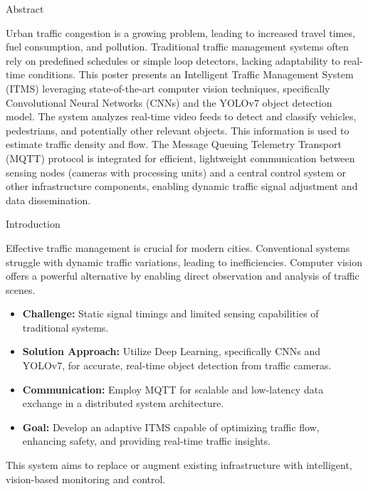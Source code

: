 \documentclass[final]{beamer}
\newlength{\colwidth}
\begin{document}
\begin{frame}[t]
\begin{columns}[t]

\begin{column}{\colwidth}

  \begin{block}{Abstract}
    
    Urban traffic congestion is a growing problem, leading to increased travel times, fuel consumption, and pollution. Traditional traffic management systems often rely on predefined schedules or simple loop detectors, lacking adaptability to real-time conditions. This poster presents an Intelligent Traffic Management System (ITMS) leveraging state-of-the-art computer vision techniques, specifically Convolutional Neural Networks (CNNs) and the YOLOv7 object detection model. The system analyzes real-time video feeds to detect and classify vehicles, pedestrians, and potentially other relevant objects. This information is used to estimate traffic density and flow. The Message Queuing Telemetry Transport (MQTT) protocol is integrated for efficient, lightweight communication between sensing nodes (cameras with processing units) and a central control system or other infrastructure components, enabling dynamic traffic signal adjustment and data dissemination.
  \end{block}

  \begin{block}{Introduction}
    
    Effective traffic management is crucial for modern cities. Conventional systems struggle with dynamic traffic variations, leading to inefficiencies. Computer vision offers a powerful alternative by enabling direct observation and analysis of traffic scenes.
    \begin{itemize}
      \item \textbf{Challenge:} Static signal timings and limited sensing capabilities of traditional systems.
      \item \textbf{Solution Approach:} Utilize Deep Learning, specifically CNNs and YOLOv7, for accurate, real-time object detection from traffic cameras.
      \item \textbf{Communication:} Employ MQTT for scalable and low-latency data exchange in a distributed system architecture.
      \item \textbf{Goal:} Develop an adaptive ITMS capable of optimizing traffic flow, enhancing safety, and providing real-time traffic insights.
    \end{itemize}
    This system aims to replace or augment existing infrastructure with intelligent, vision-based monitoring and control.
  \end{block}


\end{column}
\end{columns}
\end{frame}
\end{document}
